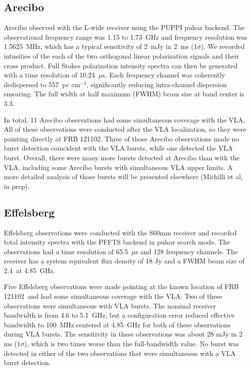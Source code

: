 \documentclass[twocolumn]{aastex61}
\newcommand{\frb}{FRB 121102}
\begin{document}
\subsection{Arecibo}

Arecibo observed with the L-wide receiver using the PUPPI pulsar backend. The observational frequency range was 1.15 to 1.73~GHz and frequency resolution was 1.5625~MHz, which has a typical sensitivity of 2~mJy in 2~ms ($1\sigma$). We recorded intnsities of the each of the two orthogonal linear polarization signals and their cross product. Full Stokes polarization intensity spectra can then be generated with a time resolution of 10.24~$\mu$s. Each frequency channel was coherently dedispersed to 557~pc cm$^{-3}$, significantly reducing intra-channel dispersion smearing. The full width at half maximum (FWHM) beam size at band center is 3.3\arcmin.

In total, 11 Arecibo observations had some simultaneous coverage with the VLA. All of these observations were conducted after the VLA localization, so they were pointing directly at \frb. Three of those Arecibo observations made no burst detection coincident with the VLA bursts, while one detected the VLA burst. 
Overall, there were many more bursts detected at Arecibo than with the VLA, including some Arecibo bursts with simultaneous VLA upper limits. A more detailed analysis of those bursts will be presented elsewhere (Michilli et al, in prep).

\subsection{Effelsberg}

Effelsberg observations were conducted with the S60mm receiver and recorded total intensity spectra with the PFFTS backend in pulsar search mode. The observations had a time resolution of 65.5~$\mu$s and 128 frequency channels. The receiver has a system equivalent flux density of 18 Jy and a FWHM beam size of 2.4\arcmin\ at 4.85~GHz. 

Five Effelsberg observations were made pointing at the known location of \frb\ and had some simultaneous coverage with the VLA. Two of these observations were simultaneous with VLA bursts. The nominal receiver bandwidth is from 4.6 to 5.1~GHz, but a configuration error reduced effective bandwidth to 100~MHz centered at 4.85~GHz for both of these observations during VLA bursts. The sensitivity in these observations was about 28 mJy in 2 ms ($1\sigma$), which is two times worse than the full-bandwidth value. No burst was detected in either of the two observations that were simultaneous with a VLA burst detection.
\end{document}
